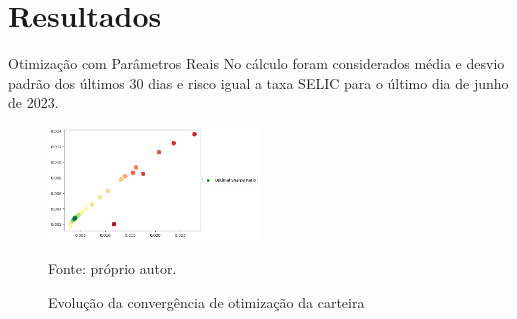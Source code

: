 
\section{Resultados}

    \begin{frame}{Otimização com Parâmetros Reais}
        No cálculo foram considerados média e desvio padrão dos últimos 30 dias e risco igual a taxa SELIC para o último dia de junho de 2023.

            \begin{figure}[H]
                \centering
                \caption{Evolução da convergência de otimização da carteira}
                \label{fig:otimizacao_ibov}
                \includegraphics[width=0.5\textwidth]{./images/otimizacao_ibov.png}
                \par \footnotesize Fonte: próprio autor.
            \end{figure}

    \end{frame}





